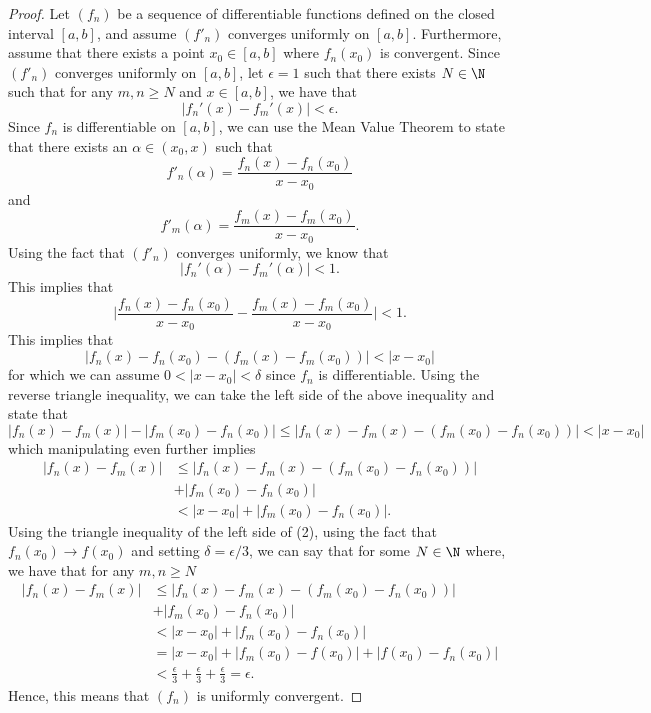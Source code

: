 \begin{proof}
    Let \( (f_n)  \) be a sequence of differentiable functions defined on the closed interval \( [a,b]  \), and assume \( (f'_n) \) converges uniformly on \( [a,b]  \). Furthermore, assume that there exists a point \( x_0 \in [a,b] \) where \( f_n(x_0)  \) is convergent. Since \( (f'_n)  \) converges uniformly on \( [a,b] \), let \( \epsilon = 1  \) such that  there exists \( N \in \N \) such that for any \( m,n \geq N \) and \( x \in [a,b]  \), we have that 
    \[  | f_n'(x) - f_m'(x)   | < \epsilon. \tag{1}\] Since \( f_n  \) is differentiable on \( [a,b]  \), we can use the Mean Value Theorem to state that there exists an \( \alpha \in (x_0, x)   \) such that 
    \[  f'_n(\alpha) = \frac{ f_n(x) - f_n(x_0)  }{ x - x_0  }  \]
    and 
    \[  f'_m(\alpha) = \frac{ f_m(x) - f_m(x_0)  }{ x - x_0 }. \]
   Using the fact that \( (f'_n)  \) converges uniformly, we know that 
   \[ | f_n'(\alpha) - f_m'(\alpha) | < 1. \] This implies that
   \[  \Big| \frac{ f_n(x) - f_n(x_0)  }{ x - x_0  } - \frac{ f_m(x) - f_m(x_0) }{ x - x_0 }  \Big| < 1. \] This implies that 
   \[  | f_n(x) - f_n(x_0) - (f_m(x) - f_m(x_0) ) | < | x - x_0  |  \]
   for which we can assume \( 0 < | x -x_0 | < \delta  \) since \( f_n  \) is differentiable. Using the reverse triangle inequality, we can take the left side of the above inequality and state that
   \[   | f_n(x) - f_m(x)  |  - | f_m(x_0) - f_n(x_0) | \leq | f_n(x) - f_m(x) - (f_m(x_0) - f_n(x_0) ) | < | x - x_0  |  \]
   which manipulating even further implies 
   \begin{align*}  | f_n(x) - f_m(x)  | &\leq | f_n(x) - f_m(x) - (f_m(x_0) - f_n(x_0) ) |  \\
       &+ | f_m(x_0) - f_n(x_0)  | \\
       &< | x - x_0 | + | f_m(x_0) - f_n(x_0) |  \tag{2}. 
   \end{align*}
   Using the triangle inequality of the left side of (2), using the fact that \( f_n(x_0) \to f(x_0)  \) and setting \( \delta = \epsilon / 3  \), we can say that for some \( N \in \N  \) where, we have that for any \( m,n \geq N  \) 
   \begin{align*}  | f_n(x) - f_m(x)  | &\leq | f_n(x) - f_m(x) - (f_m(x_0) - f_n(x_0) ) |  \\
       &+ | f_m(x_0) - f_n(x_0)  | \\
       &< | x - x_0 | + | f_m(x_0) - f_n(x_0) |  \\ 
       &= | x -x_0  | + | f_m(x_0) - f(x_0)  | + | f(x_0) - f_n(x_0) | \\
       &< \frac{ \epsilon  }{ 3 } + \frac{ \epsilon  }{ 3 } + \frac{ \epsilon  }{ 3  } = \epsilon.
   \end{align*}
   Hence, this means that \( (f_n)  \) is uniformly convergent.
\end{proof}

